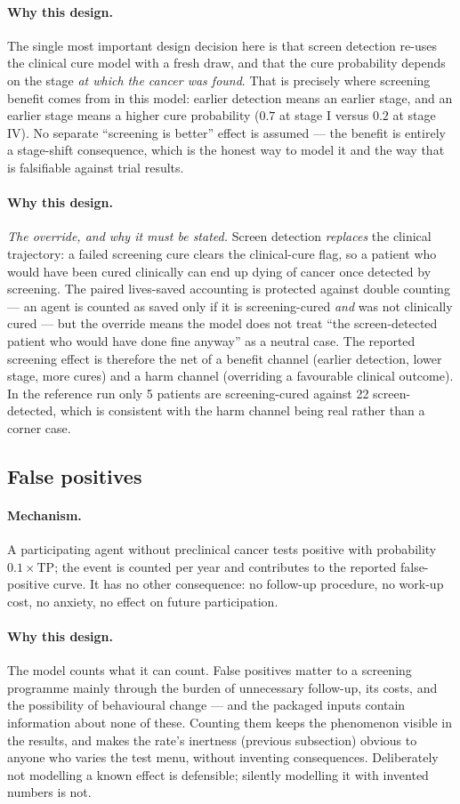 \documentclass[12pt,a4paper]{article}
\newcommand{\mech}[1]{\paragraph{Mechanism.} #1}
\newcommand{\why}[1]{\paragraph{Why this design.} #1}
\begin{document}
\why{The single most important design decision here is that screen detection re-uses the clinical cure
model with a fresh draw, and that the cure probability depends on the stage \emph{at which the cancer was
found}. That is precisely where screening benefit comes from in this model: earlier detection means an
earlier stage, and an earlier stage means a higher cure probability ($0.7$ at stage I versus $0.2$ at
stage IV). No separate ``screening is better'' effect is assumed --- the benefit is entirely a stage-shift
consequence, which is the honest way to model it and the way that is falsifiable against trial results.}

\why{\emph{The override, and why it must be stated.} Screen detection \emph{replaces} the clinical
trajectory: a failed screening cure clears the clinical-cure flag, so a patient who would have been cured
clinically can end up dying of cancer once detected by screening. The paired lives-saved accounting is
protected against double counting --- an agent is counted as saved only if it is screening-cured \emph{and}
was not clinically cured --- but the override means the model does not treat ``the screen-detected patient
who would have done fine anyway'' as a neutral case. The reported screening effect is therefore the net of
a benefit channel (earlier detection, lower stage, more cures) and a harm channel (overriding a favourable
clinical outcome). In the reference run only 5 patients are screening-cured against 22 screen-detected,
which is consistent with the harm channel being real rather than a corner case.}

\subsection{False positives}

\mech{A participating agent without preclinical cancer tests positive with probability $0.1\times\text{TP}$;
the event is counted per year and contributes to the reported false-positive curve. It has no other
consequence: no follow-up procedure, no work-up cost, no anxiety, no effect on future participation.}

\why{The model counts what it can count. False positives matter to a screening programme mainly through the
burden of unnecessary follow-up, its costs, and the possibility of behavioural change --- and the packaged
inputs contain information about none of these. Counting them keeps the phenomenon visible in the results,
and makes the rate's inertness (previous subsection) obvious to anyone who varies the test menu, without
inventing consequences. Deliberately not modelling a known effect is defensible; silently modelling it with
invented numbers is not.}
\end{document}
